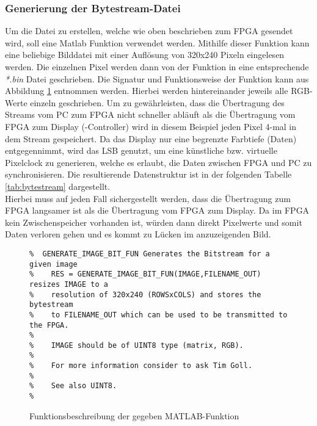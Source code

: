 \subsubsection*{Generierung der Bytestream-Datei}
Um die Datei zu erstellen, welche wie oben beschrieben zum FPGA gesendet wird, soll eine Matlab Funktion verwendet werden. Mithilfe dieser Funktion kann eine beliebige Bilddatei mit einer Auflösung von 320x240 Pixeln eingelesen werden. Die einzelnen Pixel werden dann von der Funktion in eine entsprechende \emph{*.bin} Datei geschrieben. Die Signatur und Funktionsweise der Funktion kann aus Abbildung \ref{code:signatur_bytestream} entnommen werden.
Hierbei werden hintereinander jeweils alle RGB-Werte einzeln geschrieben. Um zu gewährleisten, dass die Übertragung des Streams vom PC zum FPGA nicht schneller abläuft als die Übertragung vom FPGA zum Display (-Controller) wird in diesem Beispiel jeden Pixel 4-mal in dem Stream gespeichert. Da das Display nur eine begrenzte Farbtiefe (Daten) entgegennimmt, wird das LSB genutzt, um eine künstliche bzw. virtuelle Pixelclock zu generieren, welche es erlaubt, die Daten zwischen FPGA und PC zu synchronisieren. Die resultierende Datenstruktur ist in der folgenden Tabelle \ref{tab:bytestream} dargestellt. \\
Hierbei muss auf jeden Fall sichergestellt werden, dass die Übertragung zum FPGA langsamer ist als die Übertragung vom FPGA zum Display. Da im FPGA kein Zwischenspeicher vorhanden ist, würden dann direkt Pixelwerte und somit Daten verloren gehen und es kommt zu Lücken im anzuzeigenden Bild. 
\begin{figure}[H]
	\lstset{style=matlab-style}
\begin{lstlisting}
%  GENERATE_IMAGE_BIT_FUN Generates the Bitstream for a given image
%    RES = GENERATE_IMAGE_BIT_FUN(IMAGE,FILENAME_OUT) resizes IMAGE to a
%    resolution of 320x240 (ROWSxCOLS) and stores the bytestream
%    to FILENAME_OUT which can be used to be transmitted to the FPGA.
%    
%    IMAGE should be of UINT8 type (matrix, RGB).
% 
%    For more information consider to ask Tim Goll.
%    
%    See also UINT8.
%
\end{lstlisting}
\label{code:signatur_bytestream}
\caption{Funktionsbeschreibung der gegeben MATLAB-Funktion}
\end{figure}


